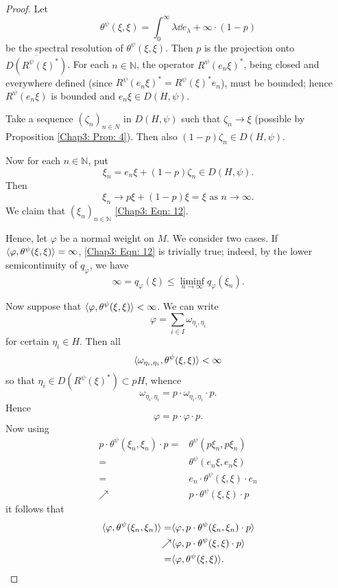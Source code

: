 \begin{proof}
    Let
    \[
        \theta^\psi(\xi,\xi)=\int_0^\infty\lambda\dd e_\lambda+\infty\cdot(1-p)
    \]
    be the spectral resolution of $\theta^\psi(\xi,\xi)$. Then $p$ is the projection onto $\overline{D(R^\psi(\xi)^*)}$. For each $n\in \mathbb{N}$, the operator $R^\psi(e_n\xi)^*$, being closed and everywhere defined (since $R^\psi(e_n\xi)^*=R^\psi(\xi)^*e_n$), must be bounded; hence $R^\psi(e_n\xi)$ is bounded and $e_n\xi\in D(H,\psi)$.\par
    Take a sequence $(\zeta_n)_{n\in N}$ in $D(H,\psi)$ such that $\zeta_n\to \xi$ (possible by Proposition \ref{Chap3: Prop: 4}). Then also $(1-p)\zeta_n\in D(H,\psi)$.\par
    Now for each $n\in \mathbb{N}$, put
    \[
        \xi_n=e_n\xi+(1-p)\zeta_n\in D(H,\psi).
    \]
    Then
    \[
        \xi_n\to p\xi+(1-p)\xi=\xi\text{ as }n\to \infty.
    \]
    We claim that $(\xi_n)_{n\in \mathbb{N}}$ \eqref{Chap3: Eqn: 12}.\par
    Hence, let $\varphi$ be a normal weight on $M$. We consider two cases. If $\langle\varphi,\theta^\psi(\xi,\xi)\rangle=\infty$, \eqref{Chap3: Eqn: 12} is trivially true; indeed, by the lower semicontinuity of $q_\varphi$, we have
    \[
        \infty=q_\varphi(\xi)\leq \liminf_{n\to \infty}q_\varphi(\xi_n).
    \]\par
    Now suppose that $\langle\varphi,\theta^\psi(\xi,\xi)\rangle<\infty$. We can write
    \[
        \varphi=\sum_{i\in I}\omega_{\eta_i,\eta_i}
    \]
    for certain $\eta_i\in H$. Then all
    \[
        \langle\omega_{\eta_i,\eta_i},\theta^\psi(\xi,\xi)\rangle<\infty
    \]
    so that $\eta_i\in D(R^\psi(\xi)^*)\subset pH$, whence
    \[
        \omega_{\eta_i,\eta_i}=p\cdot\omega_{\eta_i,\eta_i}\cdot p.
    \]
    Hence
    \[
        \varphi=p\cdot \varphi\cdot p.
    \]
    Now using
    \[
        \begin{split}
            p\cdot\theta^\psi(\xi_n,\xi_n)\cdot p=&\theta^\psi(p\xi_n,p\xi_n)\\
            =&\theta^\psi(e_n\xi,e_n\xi)\\
            =&e_n\cdot \theta^\psi(\xi,\xi)\cdot e_n\\
            \nearrow&p\cdot \theta^\psi(\xi,\xi)\cdot p
        \end{split}
    \]
    it follows that
    \[
        \begin{split}
            \langle\varphi,\theta^\psi(\xi_n,\xi_n)\rangle=&\langle\varphi,p\cdot \theta^\psi(\xi_n,\xi_n)\cdot p\rangle\\
            \nearrow&\langle\varphi,p\cdot\theta^\psi(\xi,\xi)\cdot p\rangle\\
            =&\langle\varphi,\theta^\psi(\xi,\xi)\rangle.
        \end{split}
    \]
\end{proof}
